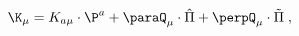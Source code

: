 \begin{equation}
\label{e4:8}
\K_{\mu}=K_{a \mu}\cdot \P^a + \paraQ_{\mu} \cdot \hat{\Pi} + \perpQ_{\mu} \cdot \tilde{\Pi} \; ,
\end{equation}

